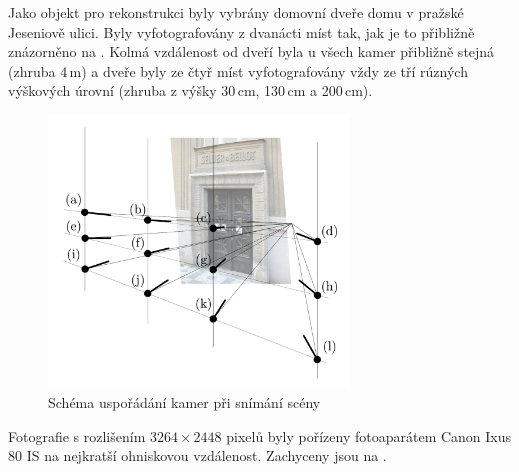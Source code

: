 \documentclass[11pt,oneside,a4paper,pdftex]{article}   %
\begin{document}
	Jako objekt pro rekonstrukci byly vybrány domovní dveře domu v pražské Jeseniově ulici. Byly
	vyfotografovány z dvanácti míst tak, jak je to přibližně znázorněno na .
	Kolmá vzdálenost od dveří byla u všech kamer přibližně stejná (zhruba 4\,m) a dveře byly ze čtyř
	míst vyfotografovány vždy ze tří rúzných výškových úrovní (zhruba z výšky 30\,cm, 130\,cm a
	200\,cm).
		\begin{figure}[htb]
			\centering
			\includegraphics[width=8cm]{pictures/usporadani_kamer.pdf}
			\caption{Schéma uspořádání kamer při snímání scény}
			\label{fig:usporadaniKamer}
		\end{figure}
	Fotografie s rozlišením $3264\times2448$ pixelů byly pořízeny fotoaparátem Canon Ixus 80
	IS na nejkratší ohniskovou vzdálenost. Zachyceny jsou na .
\end{document}
